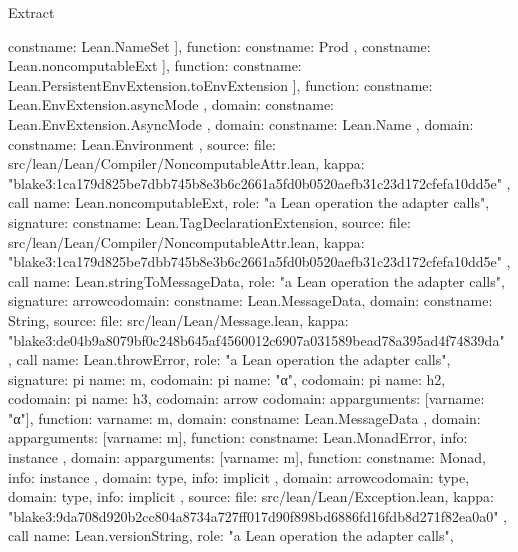 \begin{lexlean}{Extract}
\begin{toolingmodule}
{{{{{{{{{                          const{name: Lean.NameSet}
                        ],
                        function: const{name: Prod}
                      },
                      const{name: Lean.noncomputableExt}
                    ],
                    function: const{name: Lean.PersistentEnvExtension.toEnvExtension}
                  }
                ],
                function: const{name: Lean.EnvExtension.asyncMode}
              },
              domain: const{name: Lean.EnvExtension.AsyncMode}
            }
          },
          domain: const{name: Lean.Name}
        },
        domain: const{name: Lean.Environment}
      },
      source: {
        file: src/lean/Lean/Compiler/NoncomputableAttr.lean,
        kappa: "blake3:1ca179d825be7dbb745b8e3b6c2661a5fd0b0520aefb31c23d172cfefa10dd5e"
      }
    },
    call{
      name: Lean.noncomputableExt,
      role: "a Lean operation the adapter calls",
      signature: const{name: Lean.TagDeclarationExtension},
      source: {
        file: src/lean/Lean/Compiler/NoncomputableAttr.lean,
        kappa: "blake3:1ca179d825be7dbb745b8e3b6c2661a5fd0b0520aefb31c23d172cfefa10dd5e"
      }
    },
    call{
      name: Lean.stringToMessageData,
      role: "a Lean operation the adapter calls",
      signature: arrow{codomain: const{name: Lean.MessageData}, domain: const{name: String}},
      source: {
        file: src/lean/Lean/Message.lean,
        kappa: "blake3:de04b9a8079bf0c248b645af4560012c6907a031589bead78a395ad4f74839da"
      }
    },
    call{
      name: Lean.throwError,
      role: "a Lean operation the adapter calls",
      signature: pi{
        name: m,
        codomain: pi{
          name: "α",
          codomain: pi{
            name: h2,
            codomain: pi{
              name: h3,
              codomain: arrow{
                codomain: app{arguments: [var{name: "α"}], function: var{name: m}},
                domain: const{name: Lean.MessageData}
              },
              domain: app{arguments: [var{name: m}], function: const{name: Lean.MonadError}},
              info: instance
            },
            domain: app{arguments: [var{name: m}], function: const{name: Monad}},
            info: instance
          },
          domain: type{},
          info: implicit
        },
        domain: arrow{codomain: type{}, domain: type{}},
        info: implicit
      },
      source: {
        file: src/lean/Lean/Exception.lean,
        kappa: "blake3:9da708d920b2cc804a8734a727ff017d90f898bd6886fd16fdb8d271f82ea0a0"
      }
    },
    call{
      name: Lean.versionString,
      role: "a Lean operation the adapter calls",
}}
\end{toolingmodule}
\end{lexlean}
